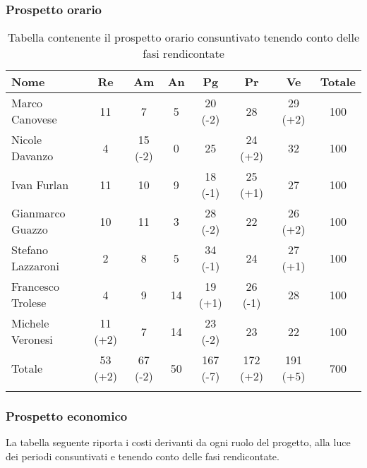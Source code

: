 \subsubsection{Prospetto orario}

\begin{longtable}{|l|c|c|c|c|c|c|c|}
	\hline
	\rowcolor{lighter-grayer}
	\textbf{Nome}     & \textbf{Re} & \textbf{Am} & \textbf{An} & \textbf{Pg} & \textbf{Pr} & \textbf{Ve} & \textbf{Totale} \\
	\hline
	\endfirsthead

	\hline
	Marco Canovese    & 11          & 7           & 5           & 20 (-2)         & 28          & 29 (+2)         & 100             \\
	\hline
	\hline
	Nicole Davanzo    & 4           & 15 (-2)         & 0           & 25          & 24 (+2)         & 32          & 100             \\
	\hline
	\hline
	Ivan Furlan       & 11          & 10          & 9           & 18 (-1)         & 25 (+1)         & 27          & 100             \\
	\hline
	\hline
	Gianmarco Guazzo  & 10          & 11          & 3           & 28 (-2)         & 22          & 26 (+2)         & 100             \\
	\hline
	\hline
	Stefano Lazzaroni & 2           & 8           & 5           & 34 (-1)         & 24          & 27 (+1)         & 100             \\
	\hline
	\hline
	Francesco Trolese & 4           & 9           & 14          & 19 (+1)         & 26 (-1)         & 28          & 100             \\
	\hline
	\hline
	Michele Veronesi  & 11 (+2)         & 7           & 14          & 23 (-2)         & 23          & 22          & 100             \\
	\hline
	\hline
	Totale            & 53 (+2)         & 67 (-2)         & 50          & 167 (-7)        & 172 (+2)        & 191 (+5)        & 700             \\
	\hline
	\rowcolor{white}
	\caption{Tabella contenente il prospetto orario consuntivato tenendo conto delle fasi rendicontate}
\end{longtable}

\subsubsection{Prospetto economico}
La tabella seguente riporta i costi derivanti da ogni ruolo del progetto, alla luce dei periodi consuntivati e tenendo conto delle fasi rendicontate.

